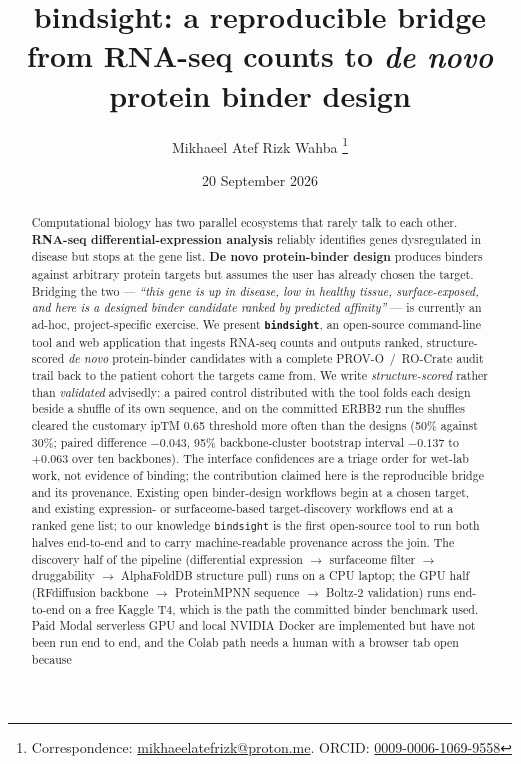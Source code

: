 \documentclass[11pt,letterpaper]{article}
\title{\textbf{bindsight: a reproducible bridge from RNA-seq counts to \textit{de novo} protein binder design}}
\author[1]{Mikhaeel Atef Rizk Wahba%
  \thanks{Correspondence: \href{mailto:mikhaeelatefrizk@proton.me}{mikhaeelatefrizk@proton.me}.
  ORCID: \href{https://orcid.org/0009-0006-1069-9558}{0009-0006-1069-9558}}}
\affil[1]{Independent Researcher, Cairo, Egypt}
\date{20 September 2026}
\begin{document}
\maketitle

\begin{abstract}
\noindent
Computational biology has two parallel ecosystems that rarely talk to each
other. \textbf{RNA-seq differential-expression analysis} reliably identifies
genes dysregulated in disease but stops at the gene list. \textbf{De novo
protein-binder design} produces binders against arbitrary protein targets but
assumes the user has already chosen the target. Bridging the two —
\textit{``this gene is up in disease, low in healthy tissue, surface-exposed,
and here is a designed binder candidate ranked by predicted affinity''} —
is currently an ad-hoc, project-specific exercise. We present
\textbf{\texttt{bindsight}}, an open-source command-line tool and web
application that ingests RNA-seq counts and outputs ranked,
structure-scored \textit{de novo} protein-binder candidates with a complete
PROV-O~/~RO-Crate audit trail back to the patient cohort the targets came
from. We write \emph{structure-scored} rather than \emph{validated}
advisedly: a paired control distributed with the tool folds each design beside
a shuffle of its own sequence, and on the committed ERBB2 run the shuffles
cleared the customary ipTM 0.65 threshold more often than the designs
(50\% against 30\%; paired difference $-0.043$, 95\% backbone-cluster
bootstrap interval $-0.137$ to $+0.063$ over ten backbones).
The interface confidences are a triage order for wet-lab work, not
evidence of binding; the contribution claimed here is the reproducible bridge
and its provenance. Existing open binder-design workflows begin at a chosen target, and
existing expression- or surfaceome-based target-discovery workflows end at a
ranked gene list; to our knowledge \texttt{bindsight} is the first open-source
tool to run both halves end-to-end and to carry machine-readable provenance
across the join. The discovery half of the pipeline (differential expression $\to$
surfaceome filter $\to$ druggability $\to$ AlphaFoldDB structure pull) runs
on a CPU laptop; the GPU half (RFdiffusion backbone $\to$
ProteinMPNN sequence $\to$ Boltz-2 validation) runs end-to-end on a free
Kaggle T4, which is the path the committed binder benchmark used. Paid Modal
serverless GPU and local NVIDIA Docker are implemented but have not been run
end to end, and the Colab path needs a human with a browser tab open because

\end{abstract}
\end{document}
